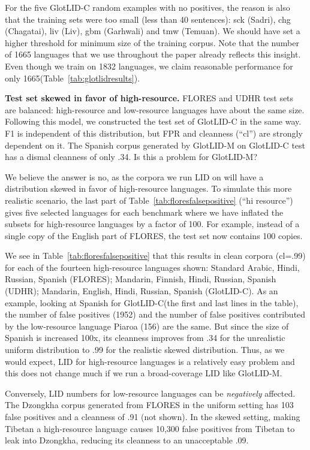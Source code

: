 \documentclass[11pt]{article}
\def\numberlanguagesaccurate{1665\xspace}
\def\numberlanguagestotal{1832\xspace}
\def\modelname{\mbox{GlotLID-M}\xspace}
\def\corpusname{\mbox{GlotLID-C}\xspace}
\def\flores{FLORES\xspace}
\def\udhr{UDHR\xspace}
\def\tabref#1{Table~\ref{tab:#1}}
\begin{document}
For the five \corpusname random examples with no positives,
the reason is also that the training sets
were too small (less than 40 sentences): sck (Sadri), chg
(Chagatai), liv (Liv), gbm (Garhwali) and tmw (Temuan). We should have set a higher threshold for
minimum size of the training corpus. Note that the number
of \numberlanguagesaccurate languages that we use throughout
the paper already reflects this insight. Even though we
train on
\numberlanguagestotal languages, we claim
reasonable performance for only
\numberlanguagesaccurate (\tabref{glotlidresults}).

\textbf{Test set skewed in favor
of high-resource.}
\flores and \udhr test sets are balanced: high-resource and
low-resource languages have about the same size. Following
this model, we constructed the test set of \corpusname
in the same way. F1 is independent of this distribution, but
FPR and cleanness (``cl'') are strongly dependent on it. The
Spanish corpus generated by \modelname on \corpusname test
has a dismal cleanness of only .34. Is this a problem
for \modelname?

We believe the answer is no, as the
corpora we run LID on will have a distribution skewed
in favor of high-resource languages.
To simulate this more realistic scenario,
the last part of \tabref{floresfalsepositive}
(``hi resource'')
gives five selected languages for each benchmark
where we have inflated the subsets for high-resource
languages by a factor of 100. For example, instead of a
single copy of the English part of \flores, the test set now
contains 100 copies.

We see in \tabref{floresfalsepositive} that this results in
clean corpora (cl=.99) for each of
the fourteen
high-resource languages shown: Standard Arabic, Hindi,
Russian, Spanish (\flores); Mandarin, Finnish, Hindi,
Russian, Spanish (\udhr); Mandarin, English, Hindi, Russian,
Spanish (\corpusname). As an example, looking at Spanish for
\corpusname (the first
and last lines in the table), the number of false positives
(1952) and the number of false positives contributed by the
low-resource language Piaroa (156) are the same. But since
the size of Spanish is increased 100x, its
cleanness improves from .34 for the unrealistic
uniform distribution to .99 for the realistic skewed
distribution. Thus, as we would
expect, LID for high-resource languages is a relatively  easy
problem and this does not change much if we run a
broad-coverage LID like \modelname.

Conversely, LID numbers for low-resource languages can be
\emph{negatively} affected.
The Dzongkha corpus generated from \flores
in the uniform setting has 103 false positives and a
cleanness of .91 (not shown). In the skewed setting, 
making Tibetan a high-resource language causes 10,300 false
positives from Tibetan to leak into Dzongkha, reducing its cleanness to an unacceptable .09. 
\end{document}
